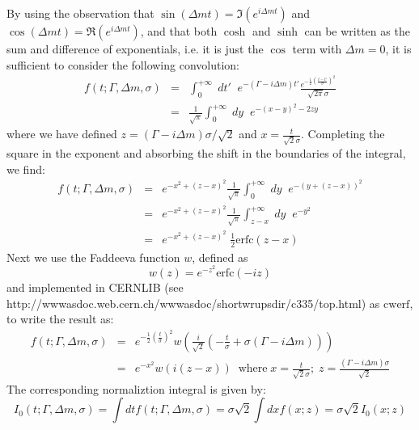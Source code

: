 \documentclass[a4paper,10pt,twosided]{article}
\begin{document}
By using the observation that $\sin(\Delta m t) = \Im\left( e^{i\Delta m t}\right)$ and $\cos(\Delta m t ) = \Re\left( e^{ i \Delta m t } \right)$, and that both $\cosh$ and $\sinh$ can
be written as the sum and difference of exponentials, i.e. it is just the $\cos$ term with $\Delta m = 0$, it is sufficient to consider the following convolution:
\begin{eqnarray*}
f(t;\Gamma,\Delta m,\sigma) &=& \int_0^{+\infty}\;dt'\;\; e^{-(\Gamma -i \Delta m)t'} \frac{ e^{-\frac{1}{2}\left( \frac{t-t'}{\sigma} \right)^2}}{\sqrt{2\pi}\sigma}
\\                          &=& \frac{1}{\sqrt{\pi}} \int_0^{+\infty}\;dy \;\;  e^{-\left(x-y \right)^2-2zy}
\end{eqnarray*}
where we have defined $z = (\Gamma - i \Delta m ) \sigma/\sqrt{2}$ and $x = \frac{t}{\sqrt{2}\sigma}$.
Completing the square in the exponent and absorbing the shift in the boundaries of the integral, we find:
\begin{eqnarray*}
f(t;\Gamma,\Delta m,\sigma) &=& e^{-x^2+(z-x)^2}  \frac{1}{\sqrt{\pi}} \int_0^{+\infty}\;dy \;\; e^{-\left(y+(z-x) \right)^2}
\\                          &=&  e^{-x^2+(z-x)^2}  \frac{1}{\sqrt{\pi}} \int_{z-x}^{+\infty}\;dy \;\; e^{-y^2 }
\\                          &=&  e^{-x^2+(z-x)^2}  \; \frac{1}{2}\mathrm{erfc}\left(z-x \right)
\end{eqnarray*}
Next we use the Faddeeva function $w$,  defined as 
\begin{equation}
    w(z) = e^{-z^2}\mathrm{erfc}\left(-iz\right)
\end{equation}
and implemented in CERNLIB (see http://wwwasdoc.web.cern.ch/wwwasdoc/shortwrupsdir/c335/top.html) as $\mathrm{cwerf}$, to write the result as:
\begin{eqnarray*}
f(t;\Gamma,\Delta m,\sigma) 
     &=& e^{-\frac{1}{2}\left(\frac{t}{\sigma}\right)^2} w\left( \frac{i}{\sqrt{2}} \left( -\frac{t}{\sigma} + \sigma\left(\Gamma-i\Delta m \right) \right)  \right)
\\ &=&  e^{-x^2} w\left( i \left( z-x\right)\right)\;\; \mathrm{where} \; x=\frac{t}{\sqrt{2}\sigma};\; z = \frac{\left(\Gamma-i\Delta m\right)\sigma}{\sqrt{2}}
\end{eqnarray*}
The corresponding normaliztion integral is given by:
\begin{equation*}
    I_0(t;\Gamma,\Delta m,\sigma)  = \int dt f(t;\Gamma,\Delta m, \sigma) = \sigma \sqrt{2} \int dx f(x;z) = \sigma \sqrt{2} I_0(x;z)
\end{equation*}
\end{document}
